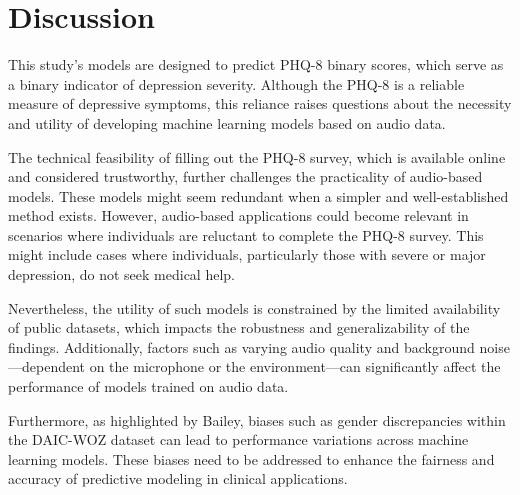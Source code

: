 \section{Discussion}

This study's models are designed to predict PHQ-8 binary scores, which serve as a binary indicator of depression severity. Although the PHQ-8 is a reliable measure of depressive symptoms\cite{phq8}, this reliance raises questions about the necessity and utility of developing machine learning models based on audio data.

The technical feasibility of filling out the PHQ-8 survey, which is available online and considered trustworthy, further challenges the practicality of audio-based models. These models might seem redundant when a simpler and well-established method exists. However, audio-based applications could become relevant in scenarios where individuals are reluctant to complete the PHQ-8 survey. This might include cases where individuals, particularly those with severe or major depression, do not seek medical help.

Nevertheless, the utility of such models is constrained by the limited availability of public datasets, which impacts the robustness and generalizability of the findings. Additionally, factors such as varying audio quality and background noise—dependent on the microphone or the environment—can significantly affect the performance of models trained on audio data.

Furthermore, as highlighted by Bailey\cite{bailey2021gender}, biases such as gender discrepancies within the DAIC-WOZ dataset can lead to performance variations across machine learning models. These biases need to be addressed to enhance the fairness and accuracy of predictive modeling in clinical applications.
